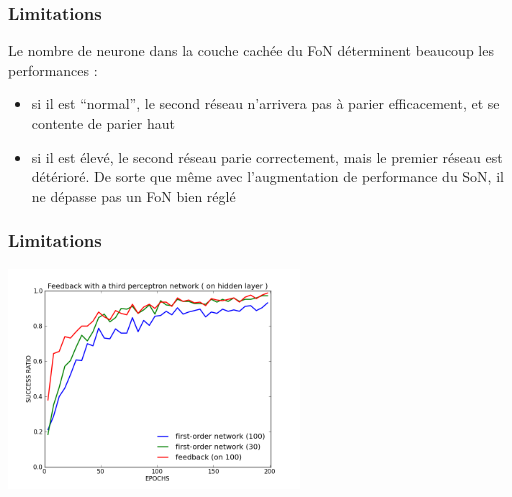\documentclass[11pt]{beamer}
\begin{document}
\begin{frame}
  \frametitle{Limitations}
  Le nombre de neurone dans la couche cachée du FoN déterminent beaucoup les performances :
  \begin{itemize}
   \item si il est ``normal'', le second réseau n'arrivera pas à parier efficacement, et se contente de 
   parier haut
   \item si il est élevé, le second réseau parie correctement, mais le premier réseau est détérioré.
   \newline
   De sorte que même avec l'augmentation de performance du SoN, il ne dépasse pas un FoN bien réglé
  \end{itemize}

\end{frame}

\begin{frame}
  \frametitle{Limitations}
  \begin{center}
    \includegraphics[height=220px]{../cleeremans_2007/digit_reco/bad_full.png}
  \end{center}
\end{frame}

%  




% 
% 
% 
% 
\end{document}
